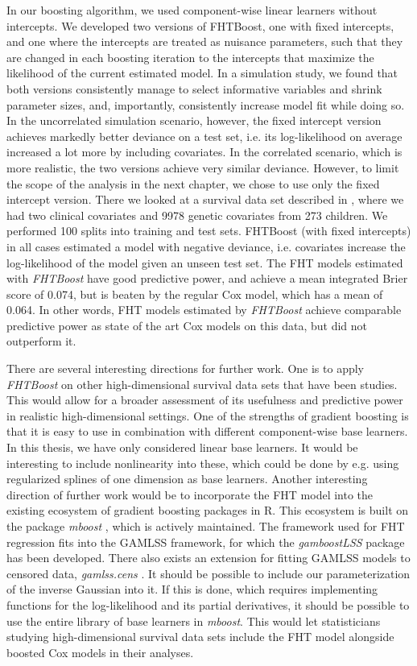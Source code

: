 In our boosting algorithm, we used component-wise linear learners without intercepts.
We developed two versions of FHTBoost, one with fixed intercepts, and one where the intercepts are treated as nuisance parameters, such that they are changed in each boosting iteration to the intercepts that maximize the likelihood of the current estimated model.
In a simulation study, we found that both versions consistently manage to select informative variables and shrink parameter sizes, and, importantly, consistently increase model fit while doing so.
In the uncorrelated simulation scenario, however, the fixed intercept version achieves markedly better deviance on a test set, i.e. its log-likelihood on average increased a lot more by including covariates.
In the correlated scenario, which is more realistic, the two versions achieve very similar deviance.
However, to limit the scope of the analysis in the next chapter, we chose to use only the fixed intercept version.
There we looked at a survival data set described in \citet{oberthuer-data}, where we had two clinical covariates and 9978 genetic covariates from 273 children.
We performed 100 splits into training and test sets.
FHTBoost (with fixed intercepts) in all cases estimated a model with negative deviance, i.e. covariates increase the log-likelihood of the model given an unseen test set.
The FHT models estimated with \textit{FHTBoost} have good predictive power, and achieve a mean integrated Brier score of 0.074, but is beaten by the regular Cox model, which has a mean of 0.064.
In other words, FHT models estimated by \textit{FHTBoost} achieve comparable predictive power as state of the art Cox models on this data, but did not outperform it.

There are several interesting directions for further work.
One is to apply \textit{FHTBoost} on other high-dimensional survival data sets that have been studies.
This would allow for a broader assessment of its usefulness and predictive power in realistic high-dimensional settings.
One of the strengths of gradient boosting is that it is easy to use in combination with different component-wise base learners.
In this thesis, we have only considered linear base learners.
It would be interesting to include nonlinearity into these, which could be done by e.g. using regularized splines of one dimension as base learners.
Another interesting direction of further work would be to incorporate the FHT model into the existing ecosystem of gradient boosting packages in R.
This ecosystem is built on the package \textit{mboost} \citep{mboost}, which is actively maintained.
The framework used for FHT regression fits into the GAMLSS \citep{gamlss} framework, for which the \textit{gamboostLSS} package \citep{gamboostlss-paper, gamboostLSS-manual} has been developed.
There also exists an extension for fitting GAMLSS models to censored data, \textit{gamlss.cens} \citep{gamlsscens}.
It should be possible to include our parameterization of the inverse Gaussian into it.
If this is done, which requires implementing functions for the log-likelihood and its partial derivatives, it should be possible to use the entire library of base learners in \textit{mboost}.
This would let statisticians studying high-dimensional survival data sets include the FHT model alongside boosted Cox models in their analyses.
